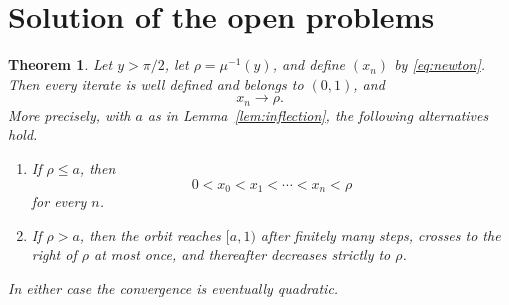 \documentclass[11pt]{article}
\newtheorem{theorem}{Theorem}[section]
\theoremstyle{remark}
\begin{document}
\section{Solution of the open problems}

\begin{theorem}\label{thm:main}
Let $y>\pi/2$, let $\rho=\mu^{-1}(y)$, and define $(x_n)$ by
\eqref{eq:newton}.  Then every iterate is well defined and belongs to
$(0,1)$, and
\[
                x_n\longrightarrow\rho.
\]
More precisely, with $a$ as in Lemma~\ref{lem:inflection}, the following
alternatives hold.
\begin{enumerate}
 \item If $\rho\le a$, then
 \[
       0<x_0<x_1<\cdots<x_n<\rho
 \]
 for every $n$.
 \item If $\rho>a$, then the orbit reaches $[a,1)$ after finitely many
 steps, crosses to the right of $\rho$ at most once, and thereafter decreases
 strictly to $\rho$.
\end{enumerate}
In either case the convergence is eventually quadratic.
\end{theorem}
\end{document}
